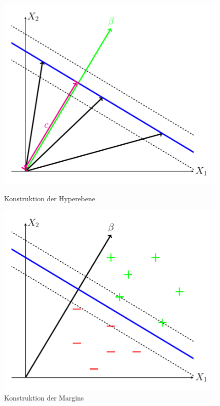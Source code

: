 \documentclass[
]{article}
\begin{document}
\begin{figure}[htb]
    \centering
    \begin{minipage}{0.45\textwidth} 
        \centering
        \includegraphics[width=\textwidth,trim=0.5cm 0.5cm 0.5cm 0.5cm]{Images/decision_boundary.pdf} 
        \caption{Konstruktion der Hyperebene}
        \label{fig:Ebene}
    \end{minipage}\hfill
    \begin{minipage}{0.45\textwidth} 
        \centering
        \includegraphics[width=\textwidth,trim=0.5cm 0.5cm 0.5cm 0.5cm]{Images/guttes.pdf}
        \caption{Konstruktion der Margins}
        \label{fig:Margin}
    \end{minipage}
\end{figure}
\end{document}
